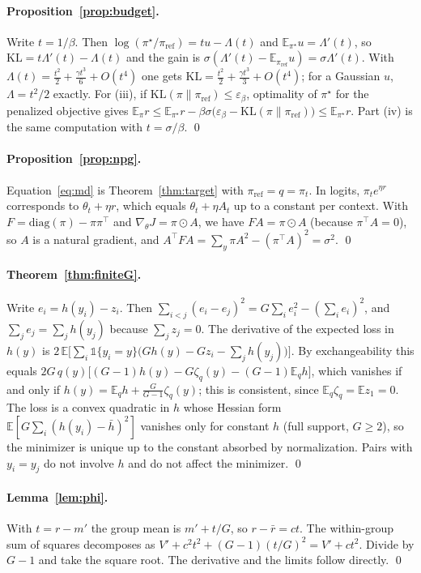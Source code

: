 \documentclass[11pt]{article}
\theoremstyle{definition}
\theoremstyle{remark}
\newcommand{\E}{\mathbb{E}}
\newcommand{\KL}{\mathrm{KL}}
\newcommand{\pref}{\pi_{\mathrm{ref}}}
\newcommand{\1}{\mathbb{1}}
\begin{document}
\paragraph{Proposition~\ref{prop:budget}.} Write $t=1/\beta$. Then
$\log(\pi^\star/\pref)=tu-\Lambda(t)$ and $\E_{\pi^\star}u=\Lambda'(t)$, so
$\KL=t\Lambda'(t)-\Lambda(t)$ and the gain is $\sigma(\Lambda'(t)-\E_{\pref}u)=\sigma\Lambda'(t)$.
With $\Lambda(t)=\frac{t^2}{2}+\frac{\gamma t^3}{6}+O(t^4)$ one gets
$\KL=\frac{t^2}{2}+\frac{\gamma t^3}{3}+O(t^4)$; for a Gaussian $u$, $\Lambda=t^2/2$ exactly.
For (iii), if $\KL(\pi\|\pref)\le\varepsilon_\beta$, optimality of $\pi^\star$ for the
penalized objective gives
$\E_\pi r\le\E_{\pi^\star}r-\beta\sigma\bigl(\varepsilon_\beta-\KL(\pi\|\pref)\bigr)\le\E_{\pi^\star}r$.
Part (iv) is the same computation with $t=\sigma/\beta$. \qed

\paragraph{Proposition~\ref{prop:npg}.} Equation~\eqref{eq:md} is Theorem~\ref{thm:target}
with $\pref=q=\pi_t$. In logits, $\pi_t e^{\eta r}$ corresponds to $\theta_t+\eta r$, which
equals $\theta_t+\eta A_t$ up to a constant per context. With
$F=\mathrm{diag}(\pi)-\pi\pi^\top$ and $\nabla_\theta J=\pi\odot A$, we have $FA=\pi\odot A$
(because $\pi^\top A=0$), so $A$ is a natural gradient, and
$A^\top FA=\sum_y\pi A^2-(\pi^\top A)^2=\sigma^2$. \qed

\paragraph{Theorem~\ref{thm:finiteG}.} Write $e_i=h(y_i)-z_i$. Then
$\sum_{i<j}(e_i-e_j)^2=G\sum_ie_i^2-(\sum_ie_i)^2$, and $\sum_je_j=\sum_jh(y_j)$ because
$\sum_jz_j=0$. The derivative of the expected loss in $h(y)$ is
$2\,\E\bigl[\sum_i\1\{y_i=y\}\bigl(Gh(y)-Gz_i-\sum_jh(y_j)\bigr)\bigr]$. By
exchangeability this equals
$2G\,q(y)\bigl[(G-1)h(y)-G\zeta_q(y)-(G-1)\E_qh\bigr]$, which vanishes if and only if
$h(y)=\E_qh+\frac{G}{G-1}\zeta_q(y)$; this is consistent, since $\E_q\zeta_q=\E z_1=0$. The
loss is a convex quadratic in $h$ whose Hessian form
$\E[G\sum_i(h(y_i)-\bar h)^2]$ vanishes only for constant $h$ (full support, $G\ge2$), so
the minimizer is unique up to the constant absorbed by normalization. Pairs with
$y_i=y_j$ do not involve $h$ and do not affect the minimizer. \qed

\paragraph{Lemma~\ref{lem:phi}.} With $t=r-m'$ the group mean is $m'+t/G$, so
$r-\bar r=ct$. The within-group sum of squares decomposes as
$V'+c^2t^2+(G-1)(t/G)^2=V'+ct^2$. Divide by $G-1$ and take the square root. The
derivative and the limits follow directly. \qed
\end{document}
